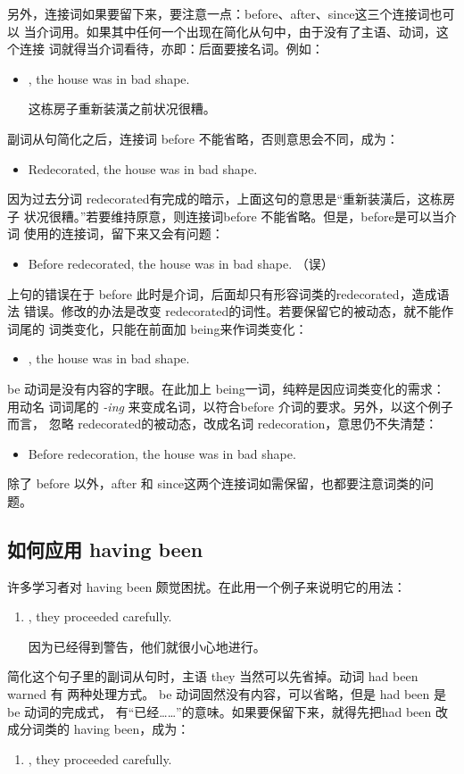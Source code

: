 另外，连接词如果要留下来，要注意一点：before、after、since这三个连接词也可以
当介词用。如果其中任何一个出现在简化从句中，由于没有了主语、动词，这个连接
词就得当介词看待，亦即：后面要接名词。例如：
\begin{itemize}
\item {}, the house was in bad shape.

  这栋房子重新装潢之前状况很糟。
\end{itemize}
副词从句简化之后，连接词 before 不能省略，否则意思会不同，成为：
\begin{itemize}
\item   Redecorated, the house was in bad shape.
\end{itemize}
因为过去分词 redecorated有完成的暗示，上面这句的意思是“重新装潢后，这栋房子
状况很糟。”若要维持原意，则连接词before 不能省略。但是，before是可以当介词
使用的连接词，留下来又会有问题：
\begin{itemize}
\item Before redecorated, the house was in bad shape. （误）
\end{itemize}
上句的错误在于 before 此时是介词，后面却只有形容词类的redecorated，造成语法
错误。修改的办法是改变 redecorated的词性。若要保留它的被动态，就不能作词尾的
词类变化，只能在前面加 being来作词类变化：
\begin{itemize}
\item {}, the house was in bad shape.
\end{itemize}

be 动词是没有内容的字眼。在此加上 being一词，纯粹是因应词类变化的需求：用动名
词词尾的 \emph{-ing} 来变成名词，以符合before 介词的要求。另外，以这个例子而言，
忽略 redecorated的被动态，改成名词 redecoration，意思仍不失清楚：
\begin{itemize}
\item Before redecoration, the house was in bad shape.
\end{itemize}

除了 before 以外，after 和 since这两个连接词如需保留，也都要注意词类的问题。

\subsection{如何应用 having been}

许多学习者对 having been 颇觉困扰。在此用一个例子来说明它的用法：
\begin{enumerate}
\item {}, they proceeded carefully.

  因为已经得到警告，他们就很小心地进行。
\end{enumerate}
简化这个句子里的副词从句时，主语 they 当然可以先省掉。动词 had been warned 有
两种处理方式。 be 动词固然没有内容，可以省略，但是 had been 是be 动词的完成式，
有“已经……”的意味。如果要保留下来，就得先把had been 改成分词类的 having
been，成为：
\begin{enumerate}[resume]
\item {}, they proceeded carefully.
\end{enumerate}

